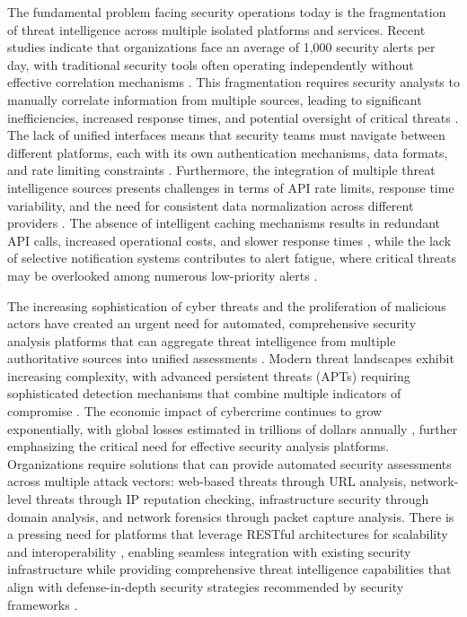\documentclass[pdflatex,sn-mathphys-num]{sn-jnl}%
\theoremstyle{thmstyleone}%
\theoremstyle{thmstyletwo}%
\theoremstyle{thmstylethree}%
\begin{document}
The fundamental problem facing security operations today is the fragmentation of threat intelligence across multiple isolated platforms and services. Recent studies indicate that organizations face an average of 1,000 security alerts per day, with traditional security tools often operating independently without effective correlation mechanisms \cite{bib2}. This fragmentation requires security analysts to manually correlate information from multiple sources, leading to significant inefficiencies, increased response times, and potential oversight of critical threats \cite{bib3}. The lack of unified interfaces means that security teams must navigate between different platforms, each with its own authentication mechanisms, data formats, and rate limiting constraints \cite{bib12}. Furthermore, the integration of multiple threat intelligence sources presents challenges in terms of API rate limits, response time variability, and the need for consistent data normalization across different providers \cite{bib19}. The absence of intelligent caching mechanisms results in redundant API calls, increased operational costs, and slower response times \cite{bib17,bib18}, while the lack of selective notification systems contributes to alert fatigue, where critical threats may be overlooked among numerous low-priority alerts \cite{bib2}.

The increasing sophistication of cyber threats and the proliferation of malicious actors have created an urgent need for automated, comprehensive security analysis platforms that can aggregate threat intelligence from multiple authoritative sources into unified assessments \cite{bib1}. Modern threat landscapes exhibit increasing complexity, with advanced persistent threats (APTs) requiring sophisticated detection mechanisms that combine multiple indicators of compromise \cite{bib5}. The economic impact of cybercrime continues to grow exponentially, with global losses estimated in trillions of dollars annually \cite{bib6}, further emphasizing the critical need for effective security analysis platforms. Organizations require solutions that can provide automated security assessments across multiple attack vectors: web-based threats through URL analysis, network-level threats through IP reputation checking, infrastructure security through domain analysis, and network forensics through packet capture analysis. There is a pressing need for platforms that leverage RESTful architectures for scalability and interoperability \cite{bib7}, enabling seamless integration with existing security infrastructure while providing comprehensive threat intelligence capabilities that align with defense-in-depth security strategies recommended by security frameworks \cite{bib9}.
\end{document}
